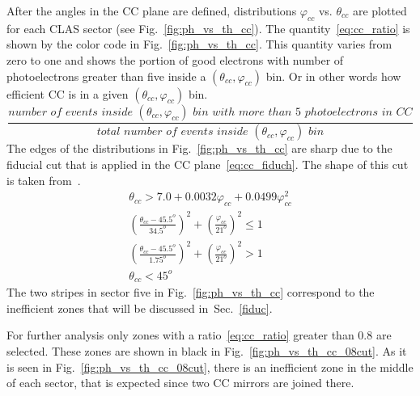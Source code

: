 After the angles in the CC plane are defined, distributions $\varphi_{cc}$ vs. $\theta_{cc}$ are plotted for each CLAS sector (see Fig.~\ref{fig:ph_vs_th_cc}).
The quantity~\ref{eq:cc_ratio} is shown by the color code in Fig.~\ref{fig:ph_vs_th_cc}. This quantity varies from zero to one and shows the portion of good electrons with number of photoelectrons greater than five inside a $(\theta_{cc},\varphi_{cc})$ bin. Or in other words how efficient CC is in a given $(\theta_{cc},\varphi_{cc})$ bin. 
\begin{equation}
\frac{number\,\, of\,\, events\,\,  inside\,\, (\theta_{cc},\varphi_{cc})\,\, bin\,\, with\,\, more\,\, than\,\, 5\,\, photoelectrons\,\, in\,\, CC}{total\,\, number\,\, of\,\, events\,\,  inside\,\, (\theta_{cc},\varphi_{cc})\,\, bin}
\label{eq:cc_ratio}
\end{equation}
The edges of the distributions in Fig.~\ref{fig:ph_vs_th_cc} are sharp due to the fiducial cut that is applied in the CC plane~\ref{eq:cc_fiduch}. 
The shape of this cut  is taken from~\cite{Khetarpal:2010}.
\begin{equation}
\begin{aligned}
\theta_{cc} > 7.0+0.0032\varphi_{cc}+0.0499\varphi_{cc}^{2} \\
\left( \frac{\theta_{cc}-45.5^{o}}{34.5^{o}} \right)^{2} + \left( \frac{\varphi_{cc}}{21^{o}} \right)^{2} \le 1 \\
\left( \frac{\theta_{cc}-45.5^{o}}{1.75^{o}} \right)^{2} + \left( \frac{\varphi_{cc}}{21^{o}} \right)^{2} > 1 \\
\theta_{cc} < 45^{o} \, \, \,  \, \, \, \, \, \,   \, \, \,  \, \, \, \, \, \,
\label{eq:cc_fiduch}
\end{aligned}
\end{equation}
The two stripes in sector five in Fig.~\ref{fig:ph_vs_th_cc} correspond to the inefficient zones that will be discussed in~Sec.~\ref{fiduc}.

For further analysis only zones with a ratio~\ref{eq:cc_ratio} greater than $0.8$ are selected. These zones are shown in black in Fig.~\ref{fig:ph_vs_th_cc_08cut}. As it is seen in Fig.~\ref{fig:ph_vs_th_cc_08cut}, there is an inefficient zone in the middle of each sector, that is expected since two CC mirrors are joined there.

